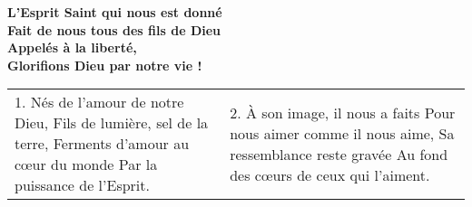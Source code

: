 \textbf{L’Esprit Saint qui nous est donné\\
Fait de nous tous des fils de Dieu\\
Appelés à la liberté,\\
Glorifions Dieu par notre vie !}

\begin{tabular}{p{} p{}}
1. Nés de l’amour de notre Dieu,\newline
Fils de lumière, sel de la terre,\newline
Ferments d’amour au cœur du monde\newline
Par la puissance de l’Esprit.
&
2. À son image, il nous a faits\newline
Pour nous aimer comme il nous aime,\newline
Sa ressemblance reste gravée\newline
Au fond des cœurs de ceux qui l’aiment.	
\end{tabular}

